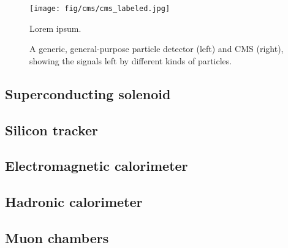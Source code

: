 \begin{figure}[htb]
    \centering
    \texttt{[image: fig/cms/cms\_labeled.jpg]}
    \caption{
        Lorem ipsum.
    }
    \label{fig:cms_labeled}
\end{figure}

\begin{figure}[htb]
    \centering
    \quad
    \caption{
        A generic, general-purpose particle detector (left) and CMS (right), showing the signals left by different kinds of particles.
    }
    \label{fig:cms_particle_id}
\end{figure}

\subsection{Superconducting solenoid}
\subsection{Silicon tracker}
\subsection{Electromagnetic calorimeter}
\subsection{Hadronic calorimeter}
\subsection{Muon chambers}

